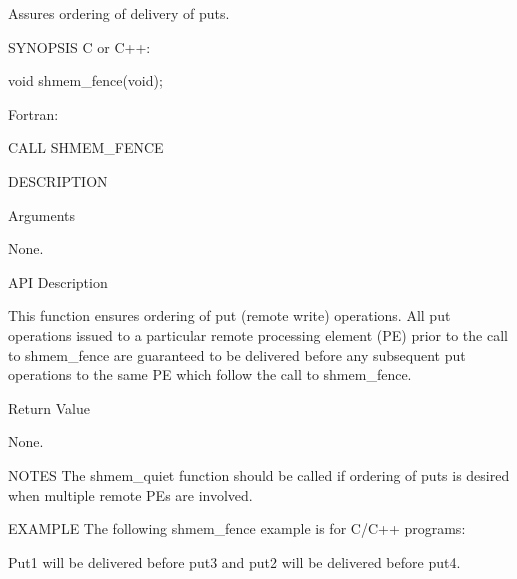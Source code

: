        Assures ordering of delivery of puts.

SYNOPSIS
       C or C++:

	  void shmem_fence(void);

       Fortran:

	  CALL SHMEM_FENCE

DESCRIPTION

Arguments
 
	None.

API Description

       This  function ensures ordering of put (remote write) operations.   All
       put operations issued to a particular remote  processing	 element  (PE)
       prior  to the call to shmem_fence are guaranteed to be delivered before
       any subsequent put operations to the same PE which follow the  call  to
       shmem_fence.

Return Value

	None.

NOTES
       The  shmem_quiet	 function  should  be  called  if  ordering of puts is
       desired when multiple remote PEs are involved.

EXAMPLE
       The following shmem_fence example is for C/C++ programs:

	

        Put1 will be delivered before put3 and put2 will be delivered before put4.

